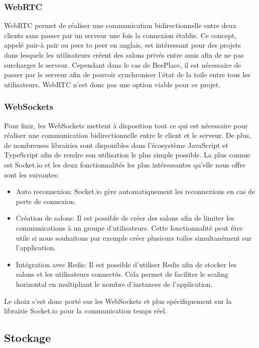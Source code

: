 \subsubsection{WebRTC}
WebRTC permet de réaliser une communication bidirectionnelle entre deux clients sans passer par un serveur une fois la connexion établie. Ce concept, appelé pair-à pair ou peer to peer en anglais, est intéressant pour des projets dans lesquels les utilisateurs créent des salons privés entre amis afin de ne pas surcharger le serveur. Cependant dans le cas de BeePlace, il est nécessaire de passer par le serveur afin de pouvoir synchroniser l'état de la toile entre tous les utilisateurs. WebRTC n'est donc pas une option viable pour ce projet.

\subsubsection{WebSockets}
Pour finir, les WebSockets mettent à disposition tout ce qui est nécessaire pour réaliser une communication bidirectionnelle entre le client et le serveur. De plus, de nombreuses librairies sont disponibles dans l'écosystème JavaScript et TypeScript afin de rendre son utilisation le plus simple possible. La plus connue est Socket.io et les deux fonctionnalités les plus intéressantes qu'elle nous offre sont les suivantes:

\begin{itemize}
  \item Auto reconnexion: Socket.io gère automatiquement les reconnexions en cas de perte de connexion.
  \item Création de salons: Il est possible de créer des salons afin de limiter les communications à un groupe d'utilisateurs. Cette fonctionnalité peut être utile si nous souhaitons par exemple créer plusieurs toiles simultanément sur l'application.
  \item Intégration avec Redis: Il est possible d'utiliser Redis afin de stocker les salons et les utilisateurs connectés. Cela permet de faciliter le scaling horizontal en multipliant le nombre d'instances de l'application.
\end{itemize}

Le choix s'est donc porté sur les WebSockets et plus spécifiquement sur la librairie Socket.io pour la communication temps réel.

\subsection{Stockage}

